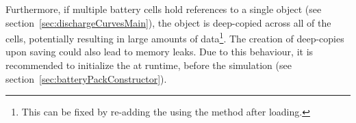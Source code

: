 Furthermore, if multiple battery cells hold references to a single  object (see section~\ref{sec:dischargeCurvesMain}), the object is deep-copied across all of the cells, potentially resulting in large amounts of data\footnote{This can be fixed by re-adding the  using the  method after loading.}. The creation of deep-copies upon saving could also lead to memory leaks. Due to this behaviour, it is recommended to initialize the  at runtime, before the simulation (see section~\ref{sec:batteryPackConstructor}).